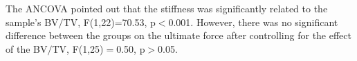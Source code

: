 \documentclass[12pt, a4paper, twoside]{report}
\begin{document}
%
The ANCOVA pointed out that the stiffness was significantly related to the sample's BV$/$TV, F(1,22)=70.53, p$<$0.001.
However, there was no significant difference between the groups on the ultimate force after controlling for the effect of the BV$/$TV, F(1,25)$=$0.50, p$>$0.05.
%
%
%
\end{document}
